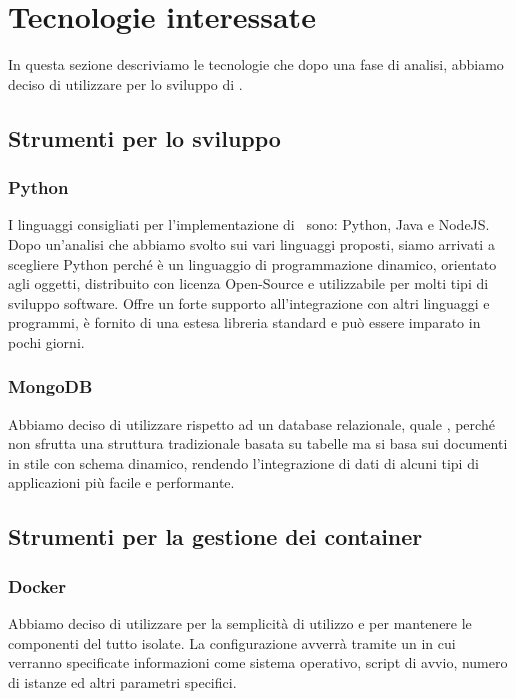 \section{Tecnologie interessate}\label{Tecnologie}
In questa sezione descriviamo le tecnologie che dopo una fase di analisi, abbiamo deciso di utilizzare per lo sviluppo di \progetto.

\subsection{Strumenti per lo sviluppo}

\subsubsection{Python}
I linguaggi consigliati per l'implementazione di \progetto\ sono: Python, Java e NodeJS. Dopo un'analisi che abbiamo svolto sui vari linguaggi proposti, siamo
arrivati a scegliere Python perché è un linguaggio di programmazione dinamico, orientato agli oggetti, distribuito con licenza Open-Source e utilizzabile
per molti tipi di sviluppo software. Offre un forte supporto all'integrazione con altri linguaggi e programmi, è fornito di una estesa libreria standard e
può essere imparato in pochi giorni.


\subsubsection{MongoDB}
Abbiamo deciso di utilizzare  rispetto ad un database relazionale, quale , perché non sfrutta una struttura tradizionale basata su
tabelle ma si basa sui documenti in stile  con schema dinamico, rendendo l’integrazione di dati di alcuni tipi di applicazioni più facile e performante.

\subsection{Strumenti per la gestione dei container}

\subsubsection{Docker}
Abbiamo deciso di utilizzare  per la semplicità di utilizzo e per mantenere le componenti del tutto isolate.
La configurazione avverrà tramite un  in cui verranno specificate informazioni come sistema operativo, script di avvio,
numero di istanze ed altri parametri specifici.

